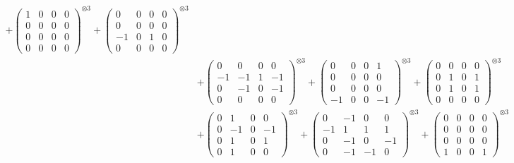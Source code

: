 \documentclass{article}
\begin{document}
{\begin{align}
            + \begin{pmatrix} 1 & 0 & 0 & 0 \\ 0 & 0 & 0 & 0 \\ 0 & 0 & 0 & 0 \\ 0 & 0 & 0 & 0 \end{pmatrix}^{\otimes 3} 
            + \begin{pmatrix} 0 & 0 & 0 & 0 \\ 0 & 0 & 0 & 0 \\ -1 & 0 & 1 & 0 \\ 0 & 0 & 0 & 0 \end{pmatrix}^{\otimes 3} \\
        &+ \label{Rs16-Rc11-Solution-10-c10} \begin{pmatrix} 0 & 0 & 0 & 0 \\ -1 & -1 & 1 & -1 \\ 0 & -1 & 0 & -1 \\ 0 & 0 & 0 & 0 \end{pmatrix}^{\otimes 3} 
            + \begin{pmatrix} 0 & 0 & 0 & 1 \\ 0 & 0 & 0 & 0 \\ 0 & 0 & 0 & 0 \\ -1 & 0 & 0 & -1 \end{pmatrix}^{\otimes 3} 
            + \begin{pmatrix} 0 & 0 & 0 & 0 \\ 0 & 1 & 0 & 1 \\ 0 & 1 & 0 & 1 \\ 0 & 0 & 0 & 0 \end{pmatrix}^{\otimes 3} \\
        &+ \label{Rs16-Rc11-Solution-10-c13} \begin{pmatrix} 0 & 1 & 0 & 0 \\ 0 & -1 & 0 & -1 \\ 0 & 1 & 0 & 1 \\ 0 & 1 & 0 & 0 \end{pmatrix}^{\otimes 3} 
            + \begin{pmatrix} 0 & -1 & 0 & 0 \\ -1 & 1 & 1 & 1 \\ 0 & -1 & 0 & -1 \\ 0 & -1 & -1 & 0 \end{pmatrix}^{\otimes 3} 
            + \begin{pmatrix} 0 & 0 & 0 & 0 \\ 0 & 0 & 0 & 0 \\ 0 & 0 & 0 & 0 \\ 1 & 0 & 0 & 1 \end{pmatrix}^{\otimes 3} \\

\end{align}}
\end{document}
